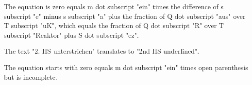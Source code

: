 The equation is zero equals m dot subscript "ein" times the difference of s subscript "e" minus s subscript "a" plus the fraction of Q dot subscript "aus" over T subscript "uK", which equals the fraction of Q dot subscript "R" over T subscript "Reaktor" plus S dot subscript "ez". 

The text "2. HS unterstrichen" translates to "2nd HS underlined".

The equation starts with zero equals m dot subscript "ein" times open parenthesis but is incomplete.